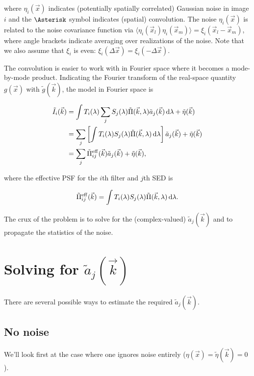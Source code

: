 \documentclass{article}
\begin{document}
where $\eta_i(\vec{x})$ indicates (potentially spatially correlated) Gaussian noise in image $i$ and
the $\Asterisk$ symbol indicates (spatial) convolution.  The noise $\eta_i(\vec{x})$ is related to
the noise covariance function via $\langle\eta_i(\vec{x}_l) \eta_i(\vec{x}_m)\rangle =
\xi_i(\vec{x}_l - \vec{x}_m)$, where angle brackets indicate averaging over realizations of the
noise.  Note that we also assume that $\xi_i$ is even: $\xi_i(\Delta\vec{x}) =
\xi_i(-\Delta\vec{x})$.

The convolution is easier to work with in Fourier space where it becomes a mode-by-mode product.
Indicating the Fourier transform of the real-space quantity $g(\vec{x})$ with $\tilde{g}(\vec{k})$,
the model in Fourier space is

\begin{align}
    \tilde{I}_i(\vec{k})
    &= \int T_i(\lambda) \sum_j S_j(\lambda) \tilde{\Pi}(\vec{k}, \lambda) \tilde{a}_j(\vec{k}) \dif{\lambda} + \tilde{\eta}(\vec{k}) \\
    &= \sum_j \left[\int T_i(\lambda) S_j(\lambda) \tilde{\Pi}(\vec{k}, \lambda) \dif{\lambda}\right] \tilde{a}_j(\vec{k}) + \tilde{\eta}(\vec{k}) \\
    \label{eqn:solveme}
    &=  \sum_j \tilde{\Pi}^\mathrm{eff}_{ij}(\vec{k}) \tilde{a}_j(\vec{k}) + \tilde{\eta}(\vec{k}),
\end{align}

where the effective PSF for the $i$th filter and $j$th SED is

\begin{equation}
  \tilde{\Pi}^\mathrm{eff}_{ij}(\vec{k}) = \int T_i(\lambda) S_j(\lambda) \tilde{\Pi}(\vec{k}, \lambda) \dif{\lambda}.
\end{equation}

The crux of the problem is to solve for the (complex-valued) $\tilde{a}_j(\vec{k})$ and to propagate
the statistics of the noise.

\section{Solving for $\tilde{a}_j(\vec{k})$}

There are several possible ways to estimate the required $\tilde{a}_j(\vec{k})$.

\subsection{No noise}

We'll look first at the case where one ignores noise entirely ($\eta(\vec{x}) =
\tilde{\eta}(\vec{k})= 0$).
\end{document}
